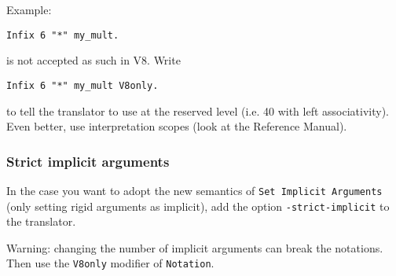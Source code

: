 \documentclass[11pt,a4paper]{article}
\begin{document}
Example:
\begin{verbatim}
Infix 6 "*" my_mult.
\end{verbatim}
is not accepted as such in V8. Write
\begin{verbatim}
Infix 6 "*" my_mult V8only.
\end{verbatim}
to tell the translator to use {\tt *} at the reserved level (i.e. 40
with left associativity). Even better, use interpretation scopes (look
at the Reference Manual).


\subsubsection{Strict implicit arguments}

In the case you want to adopt the new semantics of {\tt Set Implicit
 Arguments} (only setting rigid arguments as implicit), add the option
{\tt -strict-implicit} to the translator.

Warning: changing the number of implicit arguments can break the
notations.  Then use the {\tt V8only} modifier of {\tt Notation}.
\end{document}
